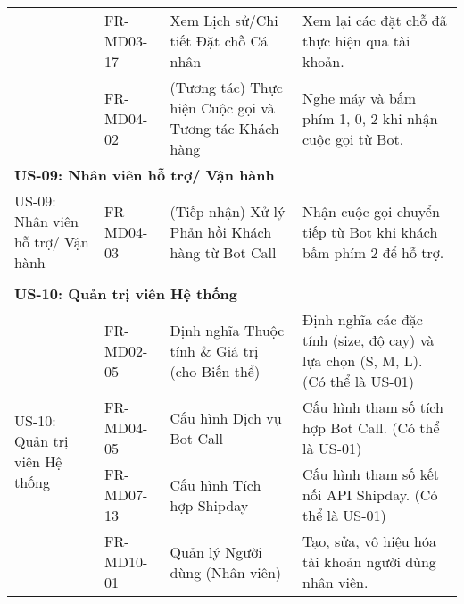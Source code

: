 \begin{longtable}{|m{2.5cm}|m{2.5cm}|m{5cm}|m{5cm}|}
	                                                        & FR-MD03-17            & Xem Lịch sử/Chi tiết Đặt chỗ Cá nhân                   & Xem lại các đặt chỗ đã thực hiện qua tài khoản.                                             \\ \cline{2-4}
	                                                        & FR-MD04-02            & (Tương tác) Thực hiện Cuộc gọi và Tương tác Khách hàng & Nghe máy và bấm phím 1, 0, 2 khi nhận cuộc gọi từ Bot.                                      \\
	\hline

	\multicolumn{4}{|l|}{\textbf{US-09: Nhân viên hỗ trợ/ Vận hành}}                                                                                                                                                                       \\ \hline
	\multirow{1}{=}[2pt]{US-09: Nhân viên hỗ trợ/ Vận hành} & FR-MD04-03            & (Tiếp nhận) Xử lý Phản hồi Khách hàng từ Bot Call      & Nhận cuộc gọi chuyển tiếp từ Bot khi khách bấm phím 2 để hỗ trợ.                            \\
	                                                        &                       &                                                        &
	\tabularnewline\hline
	\multicolumn{4}{|l|}{\textbf{US-10: Quản trị viên Hệ thống}}                                                                                                                                                                           \\ \hline
	\multirow{7}{=}[2pt]{US-10: Quản trị viên Hệ thống}     & FR-MD02-05            & Định nghĩa Thuộc tính \& Giá trị (cho Biến thể)        & Định nghĩa các đặc tính (size, độ cay) và lựa chọn (S, M, L). (Có thể là US-01)             \\ \cline{2-4}
	                                                        & FR-MD04-05            & Cấu hình Dịch vụ Bot Call                              & Cấu hình tham số tích hợp Bot Call. (Có thể là US-01)                                       \\ \cline{2-4}
	                                                        & FR-MD07-13            & Cấu hình Tích hợp Shipday                              & Cấu hình tham số kết nối API Shipday. (Có thể là US-01)                                     \\ \cline{2-4}
	                                                        & FR-MD10-01            & Quản lý Người dùng (Nhân viên)                         & Tạo, sửa, vô hiệu hóa tài khoản người dùng nhân viên.                                       \\

\end{longtable}
